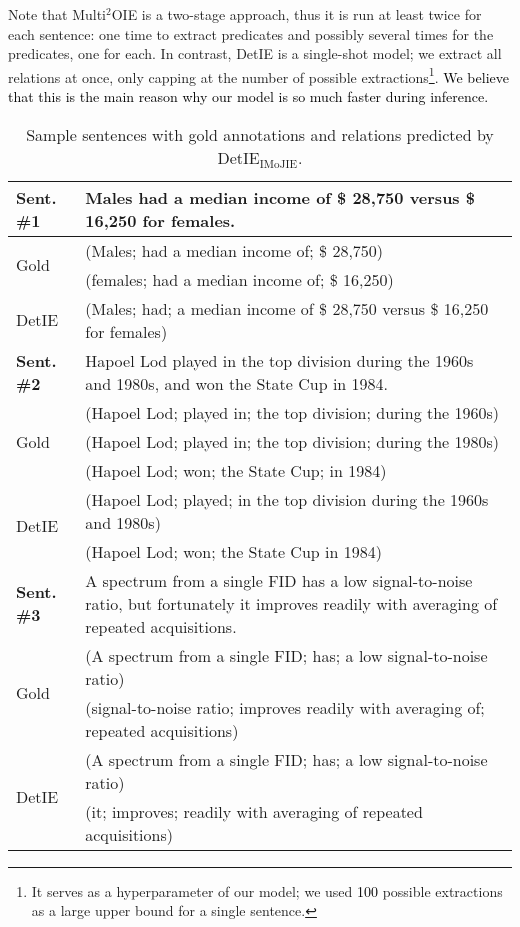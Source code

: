 \documentclass[letterpaper]{article} \usepackage{aaai22}  \usepackage{times}  \usepackage{helvet}  \usepackage{courier}  \usepackage[hyphens]{url}  \usepackage{graphicx} \usepackage{placeins}
\newcommand{\added}[1]{\textcolor{black}{#1}}
\newcommand{\camera}[1]{\textcolor{black}{#1}}
\begin{document}
Note that Multi$^2$OIE is a two-stage approach, thus it is run at least twice for each sentence: one time to extract predicates and possibly several times for the predicates, one for each. In contrast, DetIE is a single-shot model; we extract all relations at once, only capping at the number of possible extractions\footnote{It serves as a hyperparameter of our model; we used \camera{100} possible extractions as a large upper bound for a single sentence.}. \added{We believe that this is the main reason why our model is so much faster during inference.}


\begin{table}[!t]\footnotesize\setlength{\tabcolsep}{1pt}
\begin{tabular}{|p{.1\linewidth}|p{.87\linewidth}|}
\hline
\textbf{Sent. \#1} & Males had a median income of \$ 28,750 versus \$ 16,250 for females. \\ \hline
\multirow{2}{*}{Gold} & (Males; had a median income of; \$ 28,750) \\
 &  (females; had a median income of; \$ 16,250) \\  \hline
DetIE & (Males; had; a median income of \$ 28,750 versus \$ 16,250 for females) \\ \hline  \hline
\textbf{Sent. \#2} & Hapoel Lod played in the top division during the 1960s and 1980s, and won the State Cup in 1984. \\ \hline
\multirow{3}{*}{Gold} & (Hapoel Lod; played in; the top division; during the 1960s) \\
& (Hapoel Lod; played in; the top division; during the 1980s) \\
& (Hapoel Lod; won; the State Cup; in 1984) \\ \hline
\multirow{2}{*}{DetIE} & (Hapoel Lod; played; in the top division during the 1960s and 1980s) \\ 
&  (Hapoel Lod; won; the State Cup in 1984) \\ \hline  \hline
\textbf{Sent. \#3} & A spectrum from a single FID has a low signal-to-noise ratio, but fortunately it improves readily with averaging of repeated acquisitions. \\ \hline
\multirow{2}{*}{Gold} & (A spectrum from a single FID; has; a low signal-to-noise ratio) \\ 
& (signal-to-noise ratio; improves readily with averaging of; repeated acquisitions) \\  \hline
\multirow{2}{*}{DetIE} & (A spectrum from a single FID; has; a low signal-to-noise ratio) \\
 & (it; improves; readily with averaging of repeated acquisitions) \\ \hline \hline 
 
\end{tabular}
\caption{Sample sentences with gold annotations and relations predicted by DetIE$_{\mathrm{IMoJIE}}$.
}\label{tab:errors}
\end{table}
\end{document}
